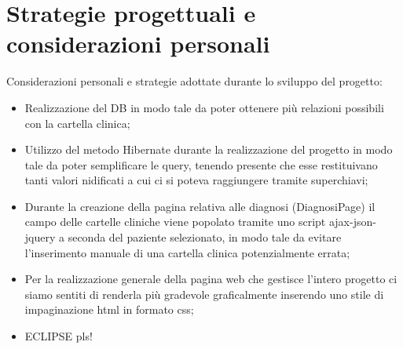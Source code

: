 \documentclass[a4paper,titlepage]{article}
\begin{document}


\part{Strategie progettuali e considerazioni personali}

Considerazioni personali e strategie adottate durante lo sviluppo del progetto:

\begin{itemize}[leftmargin=1.5cm, topsep=0.5cm, itemsep=0.2cm]

\item Realizzazione del DB in modo tale da poter ottenere più relazioni possibili con la cartella clinica;
\item Utilizzo del metodo Hibernate durante la realizzazione del progetto in modo tale da poter semplificare le query, tenendo presente che esse restituivano tanti valori nidificati a cui ci si poteva raggiungere tramite superchiavi;
\item Durante la creazione della pagina relativa alle diagnosi (DiagnosiPage) il campo delle cartelle cliniche viene popolato tramite uno script ajax-json-jquery a seconda del paziente selezionato, in modo tale da evitare l'inserimento manuale di una cartella clinica potenzialmente errata;
\item Per la realizzazione generale della pagina web che gestisce l'intero progetto ci siamo sentiti di renderla più gradevole graficalmente inserendo uno stile di impaginazione html in formato css;
\item ECLIPSE pls!

\end{itemize}
\end{document}
